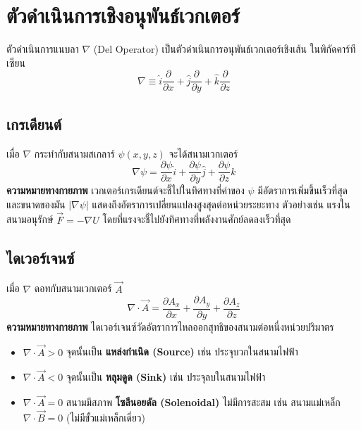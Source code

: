 \section{ตัวดำเนินการเชิงอนุพันธ์เวกเตอร์}
ตัวดำเนินการแนบลา $\nabla$ (Del Operator) เป็นตัวดำเนินการอนุพันธ์เวกเตอร์เชิงเส้น ในพิกัดคาร์ทีเซียน
\begin{equation}
\nabla \equiv \hat{i}\frac{\partial}{\partial x} + \hat{j}\frac{\partial}{\partial y} + \hat{k}\frac{\partial}{\partial z}
\end{equation}

\subsection{เกรเดียนต์}
เมื่อ $\nabla$ กระทำกับสนามสเกลาร์ $\psi(x,y,z)$ จะได้สนามเวกเตอร์
\begin{equation}
\nabla \psi = \frac{\partial \psi}{\partial x}\hat{i} + \frac{\partial \psi}{\partial y}\hat{j} + \frac{\partial \psi}{\partial z}\hat{k}
\end{equation}
\textbf{ความหมายทางกายภาพ} เวกเตอร์เกรเดียนต์จะชี้ไปในทิศทางที่ค่าของ $\psi$ มีอัตราการเพิ่มขึ้นเร็วที่สุด และขนาดของมัน $|\nabla \psi|$ แสดงถึงอัตราการเปลี่ยนแปลงสูงสุดต่อหน่วยระยะทาง ตัวอย่างเช่น แรงในสนามอนุรักษ์ $\vec{F} = -\nabla U$ โดยที่แรงจะชี้ไปยังทิศทางที่พลังงานศักย์ลดลงเร็วที่สุด

\subsection{ไดเวอร์เจนซ์}
เมื่อ $\nabla$ ดอทกับสนามเวกเตอร์ $\vec{A}$
\begin{equation}
\nabla \cdot \vec{A} = \frac{\partial A_x}{\partial x} + \frac{\partial A_y}{\partial y} + \frac{\partial A_z}{\partial z}
\end{equation}
\textbf{ความหมายทางกายภาพ} ไดเวอร์เจนซ์วัดอัตราการไหลออกสุทธิของสนามต่อหนึ่งหน่วยปริมาตร
\begin{itemize}
    \item $\nabla \cdot \vec{A} > 0$ จุดนั้นเป็น \textbf{แหล่งกำเนิด (Source)} เช่น ประจุบวกในสนามไฟฟ้า
    \item $\nabla \cdot \vec{A} < 0$ จุดนั้นเป็น \textbf{หลุมดูด (Sink)} เช่น ประจุลบในสนามไฟฟ้า
    \item $\nabla \cdot \vec{A} = 0$ สนามมีสภาพ \textbf{โซลีนอยดัล (Solenoidal)} ไม่มีการสะสม เช่น สนามแม่เหล็ก $\nabla \cdot \vec{B} = 0$ (ไม่มีขั้วแม่เหล็กเดี่ยว)
\end{itemize}

